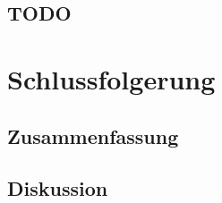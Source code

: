 \documentclass[12pt,a4paper,twoside]{scrartcl}
\numberwithin{equation}{section}
\newcounter{mypagecount}%
\newenvironment{interlude}{%
  \clearpage
  \setcounter{mypagecount}{\value{page}}%
  \thispagestyle{empty}%
  \pagestyle{empty}%
}{%
  \clearpage
  \setcounter{page}{\value{mypagecount}}%
}
\begin{document}
  	\subsection{TODO}\label{subsec:todo} %
\clearpage

\section{Schlussfolgerung}\label{sec:schlussfolgerung}
  	\subsection{Zusammenfassung}\label{subsec:zusammenfassung}
  	\subsection{Diskussion}\label{subsec:diskussion}
\clearpage
	

\begin{interlude}
  
  \begin{appendices}
  \label{anhang}
   
  \end{appendices}
  \clearpage
  
  
\end{interlude}
\end{document}
